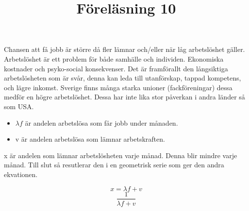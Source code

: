 \documentclass{article}
\begin{document}
Chansen att få jobb är större då fler lämnar och/eller när låg arbetslöshet gäller. Arbetslöshet är ett problem för både samhälle och individen. Ekonomiska kostnader och psyko-social konsekvenser. Det är framförallt den långsiktiga arbetslösheten som är svår, denna kan leda till utanförskap, tappad kompetens, och lägre inkomst. Sverige finns många starka unioner (fackföreningar) dessa medför en högre arbetslöshet. Dessa har inte lika stor påverkan i andra länder så som USA. 

\begin{itemize}
    \item $\lambda f $ är andelen arbetslösa som får jobb under månaden.
    \item v är andelen arbetslösa som lämnar arbetskraften. 
\end{itemize}

x är andelen som lämnar arbetslösheten varje månad. Denna blir mindre varje månad. Till slut så resutlerar den i en geometrisk serie som ger den andra ekvationen.  

$$
 x = \lambda f + v 
$$
$$
\frac{1}{\lambda f + v}
$$

\vspace{5mm}
\title{Föreläsning 10}
\vspace{5mm} \par \noindent 








\end{document}
